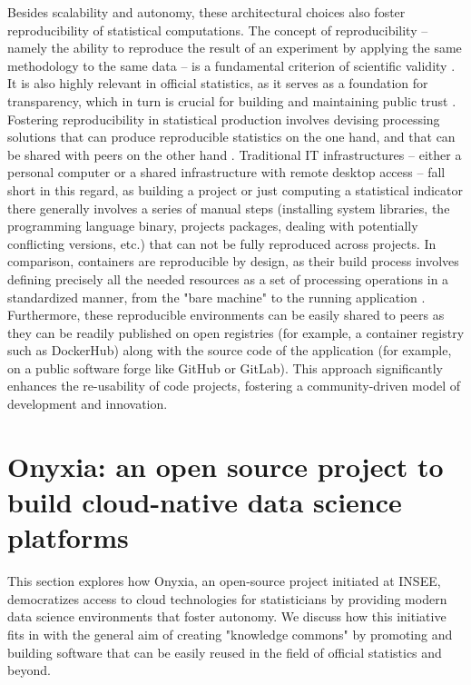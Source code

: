 \documentclass[graybox]{svmult}
\begin{document}
Besides scalability and autonomy, these architectural choices also foster reproducibility of statistical computations. The concept of reproducibility -- namely the ability to reproduce the result of an experiment by applying the same methodology to the same data -- is a fundamental criterion of scientific validity \citep{mcnutt2014reproducibility}. It is also highly relevant in official statistics, as it serves as a foundation for transparency, which in turn is crucial for building and maintaining public trust \citep{eurocodepractice2018, yung_2022, saidanietal2024quality}. Fostering reproducibility in statistical production involves devising processing solutions that can produce reproducible statistics on the one hand, and that can be shared with peers on the other hand \citep{ntts2019reproducibility}. Traditional IT infrastructures -- either a personal computer or a shared infrastructure with remote desktop access -- fall short in this regard, as building a project or just computing a statistical indicator there generally involves a series of manual steps (installing system libraries, the programming language binary, projects packages, dealing with potentially conflicting versions, etc.) that can not be fully reproduced across projects. In comparison, containers are reproducible by design, as their build process involves defining precisely all the needed resources as a set of processing operations in a standardized manner, from the "bare machine" to the running application \citep{moreau2023containers}. Furthermore, these reproducible environments can be easily shared to peers as they can be readily published on open registries (for example, a container registry such as DockerHub) along with the source code of the application (for example, on a public software forge like GitHub or GitLab). This approach significantly enhances the re-usability of code projects, fostering a community-driven model of development and innovation.




\section{Onyxia: an open source project to build cloud-native data science platforms}
\label{sec:implementation}

This section explores how Onyxia, an open-source project initiated at INSEE, democratizes access to cloud technologies for statisticians by providing modern data science environments that foster autonomy. We discuss how this initiative fits in with the general aim of creating "knowledge commons" by promoting and building software that can be easily reused in the field of official statistics and beyond.
\end{document}
